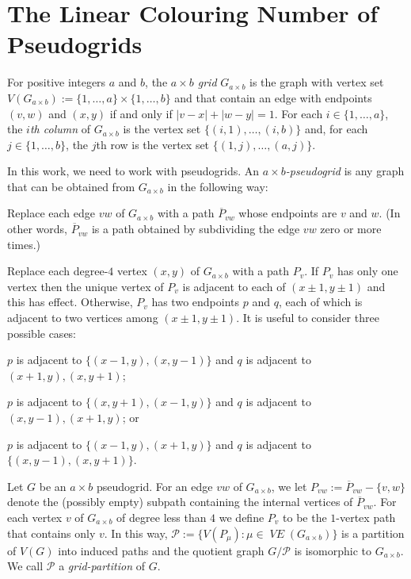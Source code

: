 \documentclass{patmorin}
\newcommand{\defin}[1]{\emph{\color{brown}#1}}
\DeclareMathOperator{\VE}{\mathit{VE}}
\begin{document}
\section{The Linear Colouring Number of Pseudogrids}

For positive integers $a$ and $b$, the \emph{$a\times b$ grid} $G_{a\times b}$ is the graph with vertex set $V(G_{a\times b}):=\{1,\ldots,a\}\times\{1,\ldots,b\}$ and that contain an edge with endpoints $(v,w)$ and $(x,y)$ if and only if $|v-x|+|w-y|=1$.  For each $i\in\{1,\ldots,a\}$, the \emph{$i$th column} of $G_{a\times b}$ is the vertex set $\{(i,1),\ldots,(i,b)\}$ and, for each $j\in\{1,\ldots,b\}$, the $j$th row is the vertex set $\{(1,j),\ldots,(a,j)\}$.

In this work, we need to work with pseudogrids.  An \defin{$a\times b$-pseudogrid} is any graph that can be obtained from $G_{a\times b}$ in the following way:
\begin{compactitem}
  \item Replace each edge $vw$ of $G_{a\times b}$ with a path $\overline{P}_{vw}$ whose endpoints are $v$ and $w$.  (In other words, $\overline{P}_{vw}$ is a path obtained by subdividing the edge $vw$ zero or more times.)
  \item Replace each degree-$4$ vertex $(x,y)$ of $G_{a\times b}$ with a path $P_v$. If $P_v$ has only one vertex then the unique vertex of $P_v$ is adjacent to each of $(x\pm 1,y\pm 1)$ and this has effect.  Otherwise, $P_v$ has two endpoints $p$ and $q$, each of which is adjacent to two vertices among $(x\pm 1,y\pm 1)$.  It is useful to consider three possible cases: 
  \begin{compactenum}[(Q1)]
    \item \label{q_i} $p$ is adjacent to $\{(x-1,y), (x,y-1)\}$ and $q$ is adjacent to $(x+1,y),(x,y+1)$;
    \item \label{q_ii} $p$ is adjacent to $\{(x,y+1), (x-1,y)\}$ and $q$ is adjacent to $(x,y-1),(x+1,y)$; or
    \item \label{q_iii} $p$ is adjacent to $\{(x-1,y),(x+1,y)\}$ and $q$ is adjacent to $\{(x,y-1),(x,y+1)\}$.
  \end{compactenum}
\end{compactitem}

Let $G$ be an $a\times b$ pseudogrid.  For an edge $vw$ of $G_{a\times b}$, we let $P_{vw}:=\overline{P}_{vw}-\{v,w\}$ denote the (possibly empty) subpath containing the internal vertices of $\overline{P}_{vw}$.  For each vertex $v$ of $G_{a\times b}$ of degree less than $4$ we define $P_{v}$ to be the $1$-vertex path that contains only $v$.  In this way, $\mathcal{P}:=\{V(P_\mu):\mu\in \VE(G_{a\times b})\}$ is a partition of $V(G)$ into induced paths and the quotient graph $G/\mathcal{P}$ is isomorphic to $G_{a\times b}$.  We call $\mathcal{P}$ a \defin{grid-partition} of $G$.  
\end{document}
